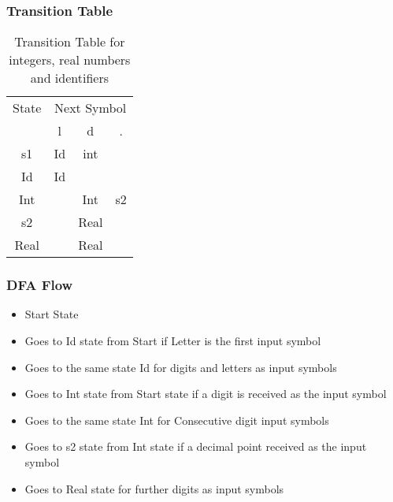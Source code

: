 \documentclass{beamer}
\begin{document}
\begin{frame}
    \frametitle{Transition Table}
    \begin{table}
        \centering
        \begin{tabular}{|c|c|c|c|}
            \toprule
            State & \multicolumn{3}{c|}{Next Symbol} \\
                \cline{2-4}
            & l & d & . \\
            \midrule
            s1 & Id & int &  \\
            \hline
            Id & Id & \ & \\
            \hline
            Int & \ & Int & s2 \\
            \hline
            s2 & \ & Real & \\
            \hline
            Real & \ & Real & \\
            \bottomrule
        \end{tabular}
        \caption{Transition Table for integers, real numbers and identifiers}
    \end{table}
\end{frame}

\begin{frame}
    \frametitle{DFA Flow}
    \begin{itemize}
        \item<1-> Start State
        \item<2-> Goes to Id state from Start if Letter is the first input symbol
        \item<3-> Goes to the same state Id for digits and letters as input symbols
        \item<4-> Goes to Int state from Start state if a digit is received as the input symbol
        \item<5-> Goes to the same state Int for Consecutive digit input symbols
        \item<6-> Goes to s2 state from Int state if a decimal point received as the input symbol
        \item<7-> Goes to Real state for further digits as input symbols
    \end{itemize}
\end{frame}
\end{document}
